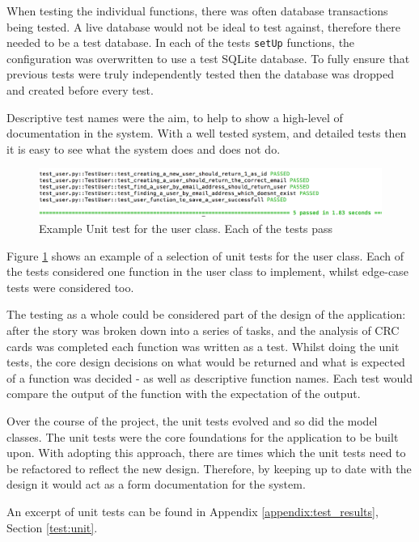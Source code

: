 When testing the individual functions, there was often database transactions being tested. A live database would not be ideal to test against, therefore there needed to be a test database. In each of the tests \texttt{setUp} functions, the configuration was overwritten to use a test SQLite database. To fully ensure that previous tests were truly independently tested then the database was dropped and created before every test.

Descriptive test names were the aim, to help to show a high-level of documentation in the system. With a well tested system, and detailed tests then it is easy to see what the system does and does not do.

\begin{figure}[h!]
  \centering
  \includegraphics[width=\textwidth]{images/unit_test_user}
  \caption{Example Unit test for the user class. Each of the tests pass}
  \label{fig:unit_user}
\end{figure}

Figure \ref{fig:unit_user} shows an example of a selection of unit tests for the user class. Each of the tests considered one function in the user class to implement, whilst edge-case tests were considered too.

The testing as a whole could be considered part of the design of the application: after the story was broken down into a series of tasks, and the analysis of CRC cards was completed each function was written as a test. Whilst doing the unit tests, the core design decisions on what would be returned and what is expected of a function was decided - as well as descriptive function names. Each test would compare the output of the function with the expectation of the output.

Over the course of the project, the unit tests evolved and so did the model classes. The unit tests were the core foundations for the application to be built upon. With adopting this approach, there are times which the unit tests need to be refactored to reflect the new design. Therefore, by keeping up to date with the design it would act as a form documentation for the system.

An excerpt of unit tests can be found in Appendix \ref{appendix:test_results}, Section \ref{test:unit}.

